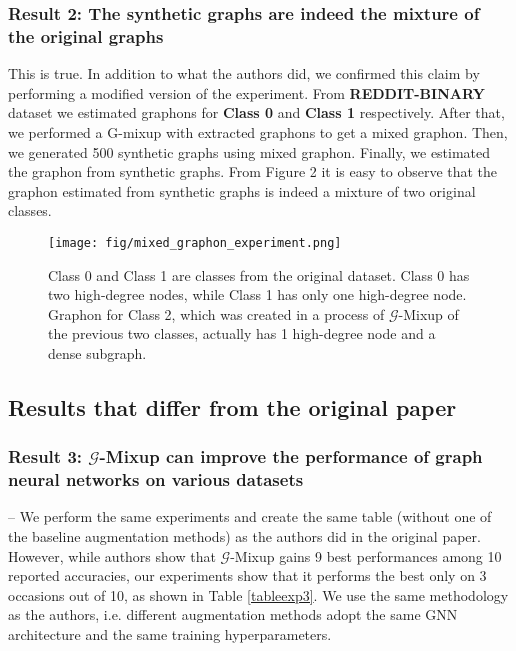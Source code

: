 \subsubsection{Result 2: The synthetic graphs are indeed the mixture of the original graphs}
This is true. In addition to what the authors did, we confirmed this claim by performing a modified version of the experiment. From \textbf{REDDIT-BINARY} dataset we estimated graphons for \textbf{Class 0} and \textbf{Class 1} respectively. After that, we performed a G-mixup with extracted graphons to get a mixed graphon. Then, we generated 500 synthetic graphs using mixed graphon. Finally, we estimated the graphon from synthetic graphs. From  Figure 2 it is easy to observe that the graphon estimated from synthetic graphs is indeed a mixture of two original classes. \\

\begin{figure}[ht]\centering
	\texttt{[image: fig/mixed\_graphon\_experiment.png]}
	\caption{ Class 0 and Class 1 are classes from the original dataset. Class 0 has two high-degree nodes, while Class 1 has only one high-degree node. Graphon for Class 2, which was created in a process of $\mathcal{G}$-Mixup of the previous two classes, actually has 1 high-degree node and a dense subgraph.}
\end{figure}

\subsection{Results that differ from the original paper}
\subsubsection{Result 3: $\mathcal{G}$-Mixup can improve the performance of graph neural networks on various datasets} -- We perform the same experiments and create the same table (without one of the baseline augmentation methods) as the authors did in the original paper. However, while authors show that $\mathcal{G}$-Mixup gains 9 best performances among 10 reported accuracies, our experiments show that it performs the best only on 3 occasions out of 10, as shown in Table \ref{tableexp3}. We use the same methodology as the authors, i.e. different augmentation methods adopt the same GNN architecture and the same training hyperparameters. 


